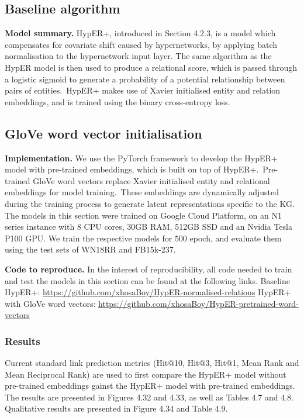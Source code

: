 \subsection{Baseline algorithm}
\textbf{Model summary.} HypER+, introduced in Section 4.2.3, is a model which compensates for covariate shift caused by hypernetworks, by applying batch normalisation to the hypernetwork input layer. The same algorithm as the HypER model is then used to produce a relational score, which is passed through a logistic sigmoid to generate a probability of a potential relationship between pairs of entities.\ HypER+ makes use of Xavier initialised entity and relation embeddings, and is trained using the binary cross-entropy loss. \par



\subsection{GloVe word vector initialisation}

\textbf{Implementation.} We use the PyTorch framework to develop the HypER+ model with pre-trained embeddings, which is built on top of HypER+.\ Pre-trained GloVe word vectors replace Xavier initialised entity and relational embeddings for model training.\ These embeddings are dynamically adjusted during the training process to generate latent representations specific to the KG. The models in this section were trained on Google Cloud Platform, on an N1 series instance with  8 CPU cores, 30GB RAM, 512GB SSD and an Nvidia Tesla P100 GPU. We train the respective models for $ 500 $ epoch, and evaluate them using the test sets of WN18RR and FB15k-237. \par 

\noindent \textbf{Code to reproduce.} In the interest of reproducibility, all code needed to train and test the models in this section can be found at the following links. \newline
Baseline HypER+: \url{https://github.com/xhosaBoy/HypER-normalised-relations} \newline
HypER+ with GloVe word vectors: \url{https://github.com/xhosaBoy/HypER-pretrained-word-vectors} \par

\subsubsection{Results}
Current standard link prediction metrics (Hit@10, Hit@3, Hit@1, Mean Rank and Mean Reciprocal Rank) are used to first compare the HypER+ model without pre-trained embeddings gainst the HypER+ model with pre-trained embeddings. The results are presented in Figures 4.32 and 4.33, as well as Tables 4.7 and 4.8. Qualitative results are presented in Figure 4.34 and Table 4.9. \par

